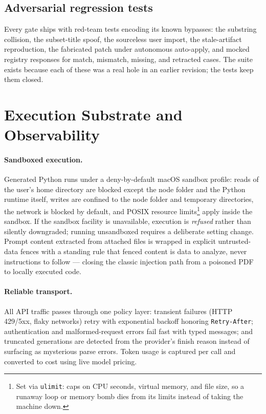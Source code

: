 \documentclass[11pt]{article}
\begin{document}
\subsection{Adversarial regression tests}

Every gate ships with red-team tests encoding its known bypasses: the substring collision, the subset-title spoof, the sourceless user import, the stale-artifact reproduction, the fabricated patch under autonomous auto-apply, and mocked registry responses for match, mismatch, missing, and retracted cases. The suite exists because each of these was a real hole in an earlier revision; the tests keep them closed.

\section{Execution Substrate and Observability}
\label{sec:substrate}

\paragraph{Sandboxed execution.}
Generated Python runs under a deny-by-default macOS sandbox profile: reads of the user's home directory are blocked except the node folder and the Python runtime itself, writes are confined to the node folder and temporary directories, the network is blocked by default, and POSIX resource limits\footnote{Set via \texttt{ulimit}: caps on CPU seconds, virtual memory, and file size, so a runaway loop or memory bomb dies from its limits instead of taking the machine down.} apply inside the sandbox. If the sandbox facility is unavailable, execution is \emph{refused} rather than silently downgraded; running unsandboxed requires a deliberate setting change. Prompt content extracted from attached files is wrapped in explicit untrusted-data fences with a standing rule that fenced content is data to analyze, never instructions to follow --- closing the classic injection path from a poisoned PDF to locally executed code.

\paragraph{Reliable transport.}
All API traffic passes through one policy layer: transient failures (HTTP 429/5xx, flaky networks) retry with exponential backoff honoring \texttt{Retry-After}; authentication and malformed-request errors fail fast with typed messages; and truncated generations are detected from the provider's finish reason instead of surfacing as mysterious parse errors. Token usage is captured per call and converted to cost using live model pricing.
\end{document}
